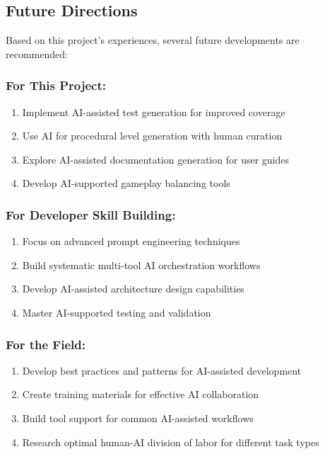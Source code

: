 \documentclass[12pt,a4paper]{article}
\begin{document}
\subsection{Future Directions}

Based on this project's experiences, several future developments are recommended:

\subsubsection*{For This Project:}
\begin{enumerate}
    \item Implement AI-assisted test generation for improved coverage
    \item Use AI for procedural level generation with human curation
    \item Explore AI-assisted documentation generation for user guides
    \item Develop AI-supported gameplay balancing tools
\end{enumerate}

\subsubsection*{For Developer Skill Building:}
\begin{enumerate}
    \item Focus on advanced prompt engineering techniques
    \item Build systematic multi-tool AI orchestration workflows
    \item Develop AI-assisted architecture design capabilities
    \item Master AI-supported testing and validation
\end{enumerate}

\subsubsection*{For the Field:}
\begin{enumerate}
    \item Develop best practices and patterns for AI-assisted development
    \item Create training materials for effective AI collaboration
    \item Build tool support for common AI-assisted workflows
    \item Research optimal human-AI division of labor for different task types
\end{enumerate}
\end{document}
